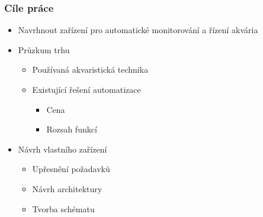 \documentclass[%
  12pt,       				%
	t,                  %
	aspectratio=1610,   %
	unicode,						%
]{beamer}				    	%
\begin{document}
\disablenavigationsymbols

\maketitle

\begin{frame} 
	\frametitle{Cíle práce}
	\begin{itemize}
			\item Navrhnout zařízení pro automatické monitorování a řízení akvária
			\item Průzkum trhu
				\begin{itemize}
					\item Používaná akvaristická technika 
					\item Existující řešení automatizace
					\begin{itemize}
						\item Cena 
						\item Rozsah funkcí
					\end{itemize}
				\end{itemize}
			\item Návrh vlastního zařízení
				\begin{itemize}
					\item Upřesnění požadavků
					\item Návrh architektury
					\item Tvorba schématu
				\end{itemize}
	\end{itemize}
\end{frame}

	
\end{document}
